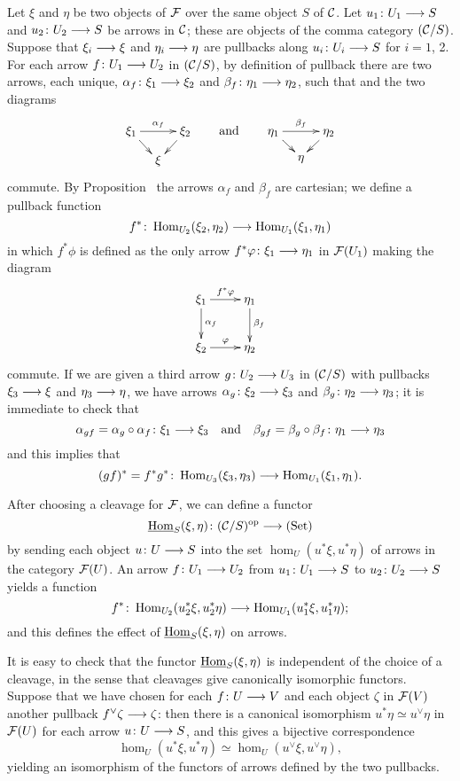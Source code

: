 \begin{3   FIBERED CATEGORIES}
\begin{3.7 The functors of arrows of a fibcat}
Let $\xi$ and $\eta$ be two objects of $\mathcal{F}$ over the same object $S$ of $\mathcal{C}$. Let $u_1 \colon U_1 \arr S$  and $u_2 \colon U_2 \arr S$ be arrows in $\mathcal{C}$; these are objects of the comma category $(\mathcal{C}/S)$. Suppose that $\xi_i \arr \xi$ and $\eta_i \arr \eta$ are pullbacks along $u_i \colon U_i \arr S$ for $i=1$, 2. For each arrow $f \colon U_1 \arr U_2$ in $(\mathcal{C}/S)$, by definition of pullback there are two arrows, each unique,  $\alpha_f \colon \xi_1 \arr \xi_2$ and $\beta_f \colon \eta_1 \arr \eta_2$, such that and the two diagrams
   \[
   \xymatrix@-15pt{\xi_1\ar[rr]^{\alpha_f}
   \ar[rd]
   && \xi_2 \ar[ld]\\ &\xi &}\qquad
   \text{and}\qquad
   \xymatrix@-15pt{\eta_1 \ar[rr]^{\beta_f}\ar[rd]
   && \eta_2\ar[ld]\\ &\eta &}
   \]
commute. By Proposition~ the arrows $\alpha_f$ and $\beta_f$ are cartesian; we define a pullback function
   \[
   f^* \colon \hom_{U_2}(\xi_2, \eta_2) \arr
   \hom_{U_1}(\xi_1, \eta_1)
   \]
in which $f^* \phi$ is defined as the only arrow $f^* \phi \colon \xi_1 \arr \eta_1$ in $\mathcal{F}(U_1)$ making the diagram
   \[
   \xymatrix{
   \xi_1\ar[r]^{f^*\phi}\ar[d]^{\alpha_f}
   & \eta_1\ar[d]^{\beta_f}\\
   \xi_2\ar[r]^{\phi} & \eta_2
   }
   \]
commute. If we are given a third arrow $g \colon U_2 \arr U_3$ in $(\mathcal{C}/S)$ with pullbacks $\xi_3\arr \xi$ and $\eta_3 \arr \eta$, we have arrows $\alpha_g \colon \xi_2 \arr \xi_3$ and $\beta_g \colon \eta_2 \arr \eta_3$; it is immediate to check that
   \[
   \alpha_{gf} = \alpha_g \circ \alpha_f
   \colon \xi_1 \arr \xi_3\quad
   \text{and}\quad
   \beta_{gf} = \beta_g \circ \beta_f
   \colon \eta_1 \arr \eta_3
   \]
and this implies that
   \[
   (gf)^* = f^* g^* \colon \hom_{U_3}(\xi_3, \eta_3)
   \arr \hom_{U_1}(\xi_1, \eta_1).
   \]

After choosing a cleavage for $\mathcal{F}$, we can define a functor
   \[
   \underhom_S(\xi, \eta) \colon (\cC/S)\op \arr
   \catset
   \]
by sending each object $u \colon U \arr S$ into the set $\hom_U(u^* \xi, u^* \eta)$ of arrows in the category $\mathcal{F}(U)$. An arrow $f \colon U_1 \arr U_2$ from $u_1 \colon U_1 \arr S$ to $u_2 \colon U_2 \arr S$ yields a function
   \[
   f^* \colon \hom_{U_2}(u^*_2\xi, u^*_2\eta)
   \arr \hom_{U_1}(u^*_1\xi, u^*_1\eta);
   \]
and this defines the effect of $\mathop{\underline{\mathrm{Hom}}}\nolimits_S(\xi, \eta)$ on arrows.

It is easy to check that the functor $\mathop{\underline{\mathrm{Hom}}}\nolimits_S(\xi, \eta)$ is independent of the choice of a cleavage, in the sense that cleavages give canonically isomorphic functors. Suppose that we have chosen for each $f \colon U \arr V$ and each object $\zeta$ in $\mathcal{F}(V)$ another pullback $f^\vee \zeta \arr \zeta$: then there is a canonical isomorphism $u^* \eta \simeq u^\vee \eta$ in $\mathcal{F}(U)$ for each arrow $u \colon U \arr S$, and this gives a bijective correspondence
   \[
   \hom_U(u^* \xi, u^* \eta) \simeq \hom_U(u^\vee
   \xi, u^\vee \eta),
   \]
yielding an isomorphism of the functors of arrows defined by the two pullbacks.


\end{3.7 The functors of arrows of a fibcat}
\end{3   FIBERED CATEGORIES}
